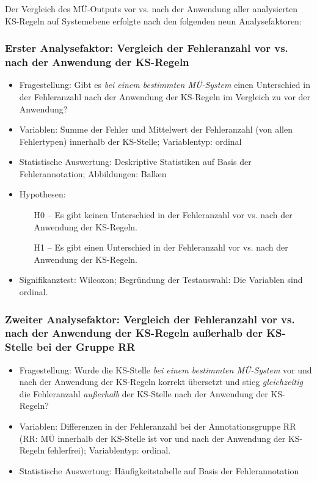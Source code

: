 Der Vergleich des MÜ-Outputs vor vs. nach der Anwendung aller analysierten KS-Regeln auf Systemebene erfolgte nach den folgenden neun Analysefaktoren:

\subsubsection*{Erster Analysefaktor: Vergleich der Fehleranzahl vor vs. nach der Anwendung der KS-Regeln}

\begin{itemize}
\item Fragestellung: Gibt es \textit{bei einem bestimmten MÜ-System} einen Unterschied in der Fehleranzahl nach der Anwendung der KS-Regeln im Vergleich zu vor der Anwendung?

\item Variablen: Summe der Fehler und Mittelwert der Fehleranzahl (von allen Fehlertypen) innerhalb der KS-Stelle; Variablentyp: ordinal

\item Statistische Auswertung: Deskriptive Statistiken auf Basis der Fehlerannotation; Abbildungen: Balken

\item Hypothesen:

\begin{itemize}

\item[H0 --] Es gibt keinen Unterschied in der Fehleranzahl vor vs. nach der Anwendung der KS-Regeln.

\item[H1 --] Es gibt einen Unterschied in der Fehleranzahl vor vs. nach der Anwendung der KS-Regeln.

\end{itemize}
\item Signifikanztest: Wilcoxon; Begründung der Testauswahl: Die Variablen sind ordinal.

\end{itemize}

\subsubsection*{Zweiter Analysefaktor: Vergleich der Fehleranzahl vor vs. nach der Anwendung der KS-Regeln außerhalb der KS-Stelle bei der Gruppe RR}

\begin{itemize}
\item Fragestellung: Wurde die KS-Stelle \textit{bei einem bestimmten MÜ-System} vor und nach der Anwendung der KS-Regeln korrekt übersetzt und stieg \textit{gleichzeitig} die Fehleranzahl \textit{außerhalb} der KS-Stelle nach der Anwendung der KS-Regeln?

\item Variablen: Differenzen in der Fehleranzahl bei der Annotationsgruppe RR (RR: MÜ innerhalb der KS-Stelle ist vor und nach der Anwendung der KS-Regeln fehlerfrei); Variablentyp: ordinal.

\item Statistische Auswertung: Häufigkeitstabelle auf Basis der Fehlerannotation

\end{itemize}


